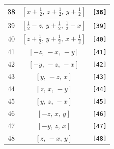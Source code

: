 \documentclass[fleqn,8pt]{jsarticle}
\begin{document}
\begin{longtable}{ccc}
38 & $\left[ x + \frac{1}{2},\, z + \frac{1}{2},\, y + \frac{1}{2} \right]$ & {\tt [38]} \\ \hline
39 & $\left[ \frac{1}{2} - z,\, y + \frac{1}{2},\, \frac{1}{2} - x \right]$ & {\tt [39]} \\ \hline
40 & $\left[ z + \frac{1}{2},\, y + \frac{1}{2},\, x + \frac{1}{2} \right]$ & {\tt [40]} \\ \hline
41 & $\left[ - z,\, - x,\, - y \right]$ & {\tt [41]} \\ \hline
42 & $\left[ - y,\, - z,\, - x \right]$ & {\tt [42]} \\ \hline
43 & $\left[ y,\, - z,\, x \right]$ & {\tt [43]} \\ \hline
44 & $\left[ z,\, x,\, - y \right]$ & {\tt [44]} \\ \hline
45 & $\left[ y,\, z,\, - x \right]$ & {\tt [45]} \\ \hline
46 & $\left[ - z,\, x,\, y \right]$ & {\tt [46]} \\ \hline
47 & $\left[ - y,\, z,\, x \right]$ & {\tt [47]} \\ \hline
48 & $\left[ z,\, - x,\, y \right]$ & {\tt [48]} \\
\end{longtable}
\end{document}
